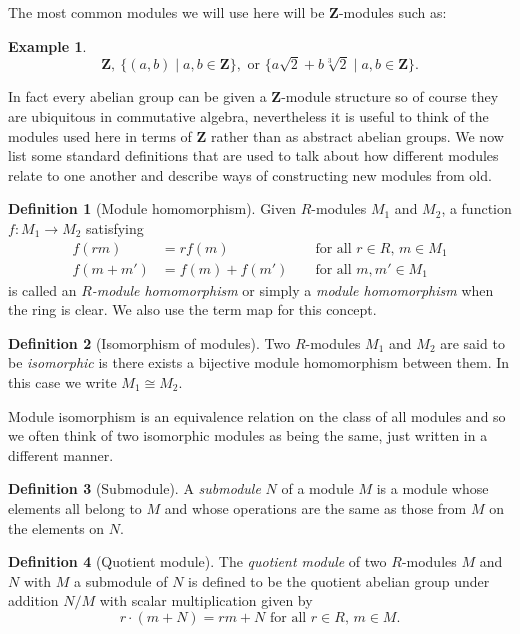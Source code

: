 \documentclass[12pt,a4paper,abstracton,bibtotoc]{scrreprt}
\theoremstyle{definition}
\newtheorem{defn}{Definition}
\newtheorem{ex}{Example}
\newcommand{\ZZ}{\mathbf{Z}}
\begin{document}
The most common modules we will use here will be $\ZZ$-modules such as:
\begin{ex}
\[
\ZZ,\ \{(a,b)\mid a,b\in \ZZ\},\text{ or }\{a\sqrt{2} + b\sqrt[3]{2}\mid a,b\in \ZZ\}.
\]
\end{ex}
In fact every abelian group can be given a $\ZZ$-module structure so of course they are ubiquitous in commutative algebra, nevertheless it is useful to think of the modules used here in terms of $\ZZ$ rather than as abstract abelian groups.
We now list some standard definitions that are used to talk about how different modules relate to one another and describe ways of constructing new modules from old.

\begin{defn}[Module homomorphism]
Given $R$-modules $M_1$ and $M_2$, a function $f\colon M_1 \to M_2$ satisfying
\begin{align*}
f(rm) &= rf(m) &&\text{ for all $r\in R$, $m\in M_1$}\\
f(m + m') &= f(m) + f(m')&&\text{ for all $m,m'\in M_1$}
\end{align*}
is called an \emph{$R$-module homomorphism} or simply a \emph{module homomorphism} when the ring is clear.
We also use the term map for this concept.
\end{defn}

\begin{defn}[Isomorphism of modules]
Two $R$-modules $M_1$ and $M_2$ are said to be \emph{isomorphic} is there exists a bijective module homomorphism between them. 
In this case we write $M_1\cong M_2$.
\end{defn}

Module isomorphism is an equivalence relation on the class of all modules and so we often think of two isomorphic modules as being the same, just written in a different manner.

\begin{defn}[Submodule]
A \emph{submodule} $N$ of a module $M$ is a module whose elements all belong to $M$ and whose operations are the same as those from $M$ on the elements on $N$.
\end{defn}

\begin{defn}[Quotient module]
The \emph{quotient module} of two $R$-modules $M$ and $N$ with $M$ a submodule of $N$ is defined to be the quotient abelian group under addition $N/
M$ with scalar multiplication given by
\[
r\cdot(m + N) = rm + N\text{ for all $r\in R$, $m\in M$}.
\]
\end{defn}
\end{document}

